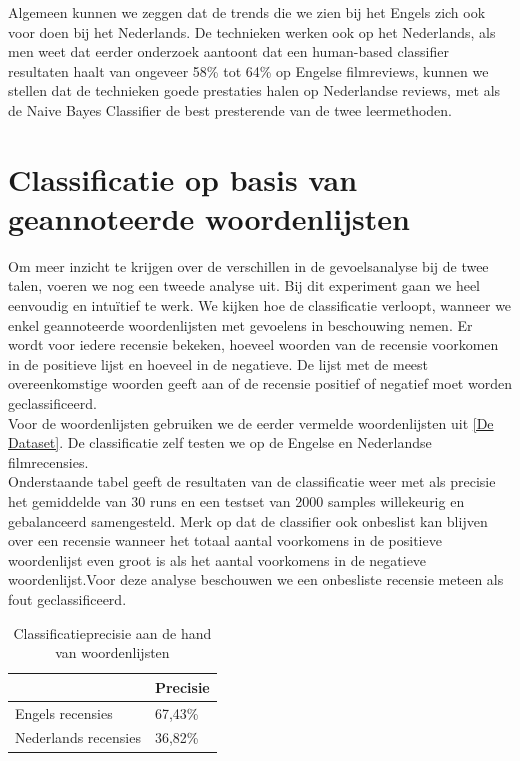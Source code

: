 Algemeen kunnen we zeggen dat de trends die we zien bij het Engels zich ook voor doen bij het Nederlands. De technieken werken ook op het Nederlands, als men weet dat eerder onderzoek \cite{pang2002thumbs} aantoont dat een human-based classifier resultaten haalt van ongeveer 58\% tot 64\% op Engelse filmreviews, kunnen we stellen dat de technieken goede prestaties halen op Nederlandse reviews, met als de Naive Bayes Classifier de best presterende van de twee leermethoden.


\section{Classificatie op basis van geannoteerde woordenlijsten}\label{Classificatie op basis van geannoteerde woordenlijsten}

Om meer inzicht te krijgen over de verschillen in de gevoelsanalyse bij de twee talen, voeren we nog een tweede analyse uit. Bij dit experiment gaan we heel eenvoudig en intu\"itief te werk. We kijken hoe de classificatie verloopt, wanneer we enkel geannoteerde woordenlijsten met gevoelens in beschouwing nemen. Er wordt voor iedere recensie bekeken, hoeveel woorden van de recensie voorkomen in de positieve lijst en hoeveel in de negatieve. De lijst met de meest overeenkomstige woorden geeft aan of de recensie positief of negatief moet worden geclassificeerd.\\
Voor de woordenlijsten gebruiken we de eerder vermelde woordenlijsten uit \ref{De Dataset}. De classificatie zelf testen we op de Engelse en Nederlandse filmrecensies.\\
Onderstaande tabel geeft de resultaten van de classificatie weer met als precisie het gemiddelde van 30 runs en een testset van 2000 samples willekeurig en gebalanceerd samengesteld. Merk op dat de classifier ook onbeslist kan blijven over een recensie wanneer het totaal aantal voorkomens in de positieve woordenlijst even groot is als het aantal voorkomens in de negatieve woordenlijst.Voor deze analyse beschouwen we een onbesliste recensie meteen als fout geclassificeerd.

\begin{table}[h]
\centering
\begin{tabular}{l|l|}
\cline{2-2}
                                           & Precisie \\ \hline
\multicolumn{1}{|l|}{Engels recensies}     & 67,43\%  \\ \hline
\multicolumn{1}{|l|}{Nederlands recensies} & 36,82\%   \\ \hline
\end{tabular}
\caption{Classificatieprecisie aan de hand van woordenlijsten}
\end{table}

